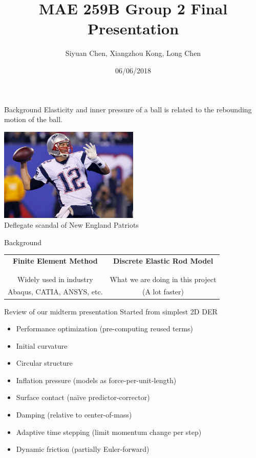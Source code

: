 \documentclass{beamer}
\title{MAE 259B Group 2 Final Presentation}
\date{06/06/2018}
\author{Siyuan Chen, Xiangzhou Kong, Long Chen}
\begin{document}
    \maketitle
    \begin{frame}{Background}
    	Elasticity and inner pressure of a ball is related to the rebounding motion of the ball.
    	\begin{center}
    		\includegraphics[width=0.5\textwidth]{res/football.jpg}\\
    		\footnotesize Deflegate scandal of New England Patriots
    	\end{center}
    \end{frame}
    \begin{frame}{Background}
    	\begin{center}
			\begin{tabular}{c|c}
				\textbf{Finite Element Method} & \textbf{Discrete Elastic Rod Model}\\
				& \\\hline
				& \\
				Widely used in industry & What we are doing in this project\\
				Abaqus, CATIA, ANSYS, etc. & (A lot faster)
			\end{tabular}
		\end{center}
	\end{frame}
    \begin{frame}{Review of our midterm presentation}
    	Started from simplest 2D DER
    	\begin{itemize}
    		\item Performance optimization (pre-computing reused terms)
    		\item Initial curvature
    		\item Circular structure
    		\item Inflation pressure (models as force-per-unit-length)
    		\item Surface contact (naïve predictor-corrector)
    		\item Damping (relative to center-of-mass)
    		\item Adaptive time stepping (limit momentum change per step)
    		\item Dynamic friction (partially Euler-forward)
    	\end{itemize}
    \end{frame}
\end{document}
